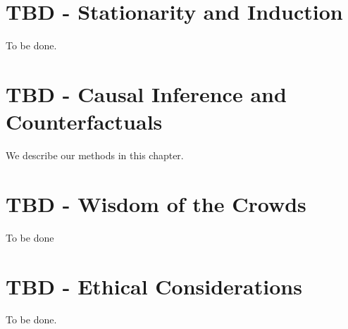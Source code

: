 \documentclass[]{tufte-book}
\theoremstyle{definition}
\theoremstyle{definition}
\theoremstyle{definition}
\theoremstyle{remark}
\begin{document}
\hypertarget{tbd---stationarity-and-induction}{%
\chapter{TBD - Stationarity and Induction}\label{tbd---stationarity-and-induction}}

To be done.

\hypertarget{tbd---causal-inference-and-counterfactuals}{%
\chapter{TBD - Causal Inference and Counterfactuals}\label{tbd---causal-inference-and-counterfactuals}}

We describe our methods in this chapter.

\hypertarget{tbd---wisdom-of-the-crowds}{%
\chapter{TBD - Wisdom of the Crowds}\label{tbd---wisdom-of-the-crowds}}

To be done

\hypertarget{tbd---ethical-considerations}{%
\chapter{TBD - Ethical Considerations}\label{tbd---ethical-considerations}}

To be done.


\end{document}
